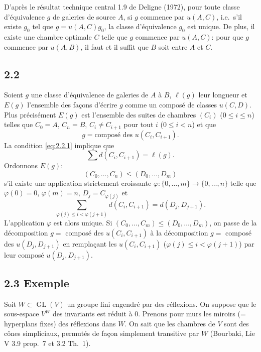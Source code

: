 \documentclass[11pt,a4paper]{article}
\theoremstyle{plain}
\theoremstyle{definition}
\DeclareMathOperator{\GL}{GL}
\begin{document}
D'apr\`es le r\'esultat technique central 1.9 de Deligne (1972), pour toute classe d'\'equivalence $g$ de galeries de source $A$, si $g$ commence par $u(A,C)$, i.e.\ s'il existe $g_0$ tel que $g = u(A,C) g_0$, la classe d'\'equivalence $g_0$ est unique. De plus, il existe une chambre optimale $C$ telle que $g$ commence par $u(A,C)$: pour que $g$ commence par $u(A,B)$, il faut et il suffit que $B$ soit entre $A$ et $C$.

\subsection*{2.2}

Soient $g$ une classe d'\'equivalence de galeries de $A$ \`a $B$, $\ell(g)$ leur longueur et $E(g)$ l'ensemble des fa\c{c}ons d'\'ecrire $g$ comme un compos\'e de classes $u(C,D)$. Plus pr\'ecis\'ement $E(g)$ est l'ensemble des suites de chambres $(C_i)$ ($0 \leq i \leq n$) telles que $C_0 = A$, $C_n = B$, $C_i \not= C_{i+1}$ pour tout $i$ ($0 \leq i < n$) et que
\begin{equation}\label{eq:2.2.1}
g = \text{compos\'e des } u(C_i, C_{i+1}).
\tag{2.2.1}
\end{equation}
La condition \eqref{eq:2.2.1} implique que
\begin{equation}\label{eq:2.2.2}
\sum d(C_i, C_{i+1}) = \ell(g).
\tag{2.2.2}
\end{equation}
Ordonnons $E(g)$:
\[
(C_0, \ldots, C_n) \leq (D_0, \ldots, D_m)
\]
s'il existe une application strictement croissante $\varphi : \{0, \ldots, m\} \to \{0, \ldots, n\}$ telle que $\varphi(0) = 0$, $\varphi(m) = n$, $D_j = C_{\varphi(j)}$ et
\[
\sum_{\varphi(j) \leq i < \varphi(j+1)} d(C_i, C_{i+1}) = d(D_j, D_{j+1}).
\]
L'application $\varphi$ est alors unique. Si $(C_0, \ldots, C_m) \leq (D_0, \ldots, D_m)$, on passe de la d\'ecomposition $g =$ compos\'e des $u(C_i, C_{i+1})$ \`a la d\'ecomposition $g =$ compos\'e des $u(D_j, D_{j+1})$ en rempla\c{c}ant les $u(C_i, C_{i+1})$ ($\varphi(j) \leq i < \varphi(j+1)$) par leur compos\'e $u(D_j, D_{j+1})$.

\subsection*{2.3 Exemple}\label{sec:2.3}

Soit $W \subset \GL(V)$ un groupe fini engendr\'e par des r\'eflexions. On suppose que le sous-espace $V^W$ des invariants est r\'eduit \`a $0$. Prenons pour murs les miroirs (= hyperplans fixes) des r\'eflexions dans $W$. On sait que les chambres de $V$ sont des c\^ones simpliciaux, permut\'es de fa\c{c}on simplement transitive par $W$ (Bourbaki, Lie V 3.9 prop.~7 et 3.2 Th.~1).
\end{document}
